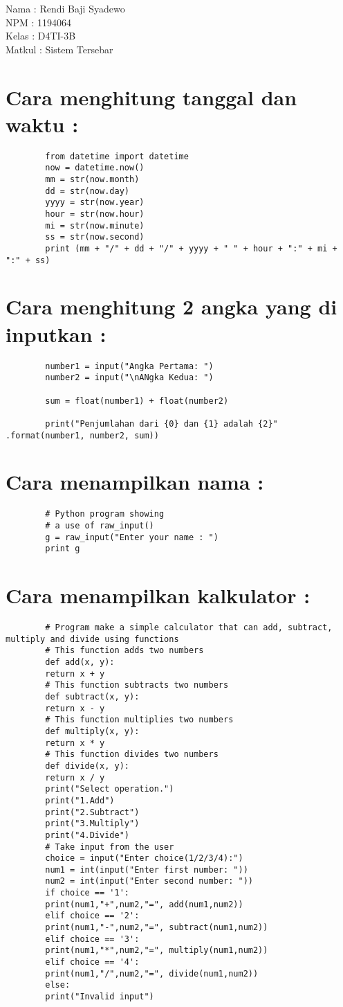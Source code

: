 \documentclass{article}
\begin{document}
Nama	: Rendi Baji Syadewo \\
NPM		: 1194064 \\
Kelas	: D4TI-3B \\
Matkul	: Sistem Tersebar \\
	
	\section {Cara menghitung tanggal dan waktu :}
	\begin{lstlisting}
		from datetime import datetime
		now = datetime.now()
		mm = str(now.month)
		dd = str(now.day)
		yyyy = str(now.year)
		hour = str(now.hour)
		mi = str(now.minute)
		ss = str(now.second)
		print (mm + "/" + dd + "/" + yyyy + " " + hour + ":" + mi + ":" + ss)
	\end{lstlisting}

	\section {Cara menghitung 2 angka yang di inputkan :}
	\begin{lstlisting}
		number1 = input("Angka Pertama: ")
		number2 = input("\nANgka Kedua: ")
		
		sum = float(number1) + float(number2)
		
		print("Penjumlahan dari {0} dan {1} adalah {2}" .format(number1, number2, sum)) 
	\end{lstlisting}

	\section {Cara  menampilkan nama :}
	\begin{lstlisting}
		# Python program showing
		# a use of raw_input()
		g = raw_input("Enter your name : ")
		print g 
	\end{lstlisting}

	\section {Cara  menampilkan kalkulator :}
	\begin{lstlisting}
		# Program make a simple calculator that can add, subtract, multiply and divide using functions
		# This function adds two numbers
		def add(x, y):
		return x + y
		# This function subtracts two numbers
		def subtract(x, y):
		return x - y
		# This function multiplies two numbers
		def multiply(x, y):
		return x * y
		# This function divides two numbers
		def divide(x, y):
		return x / y
		print("Select operation.")
		print("1.Add")
		print("2.Subtract")
		print("3.Multiply")
		print("4.Divide")
		# Take input from the user
		choice = input("Enter choice(1/2/3/4):")
		num1 = int(input("Enter first number: "))
		num2 = int(input("Enter second number: "))
		if choice == '1':
		print(num1,"+",num2,"=", add(num1,num2))
		elif choice == '2':
		print(num1,"-",num2,"=", subtract(num1,num2))
		elif choice == '3':
		print(num1,"*",num2,"=", multiply(num1,num2))
		elif choice == '4':
		print(num1,"/",num2,"=", divide(num1,num2))
		else:
		print("Invalid input")
	\end{lstlisting}
\end{document}
